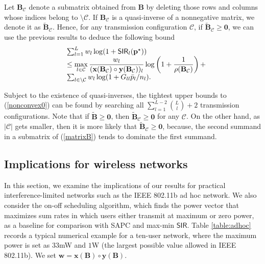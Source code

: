 \documentclass[10pt,twocolumn]{IEEEtran}
\newcommand{\0}{\mathbf{0}}
\newcommand{\1}{\mathbf{1}}
\begin{document}
Let $\mathbf{B}_{\mathcal{C}}$ denote a submatrix obtained from $\mathbf{B}$ by deleting those rows and columns whose indices belong to $\setminus \mathcal{C}$. If $\mathbf{B}_{\mathcal{C}}$ is a quasi-inverse of a nonnegative matrix, we denote it as $\mathbf{\tilde{B}}_{\mathcal{C}}$. Hence, for any transmission configuration $\mathcal{C}$, if $\mathbf{\tilde{B}}_{\mathcal{C}} \ge \mathbf{0}$, we can use the previous results to deduce the following bound
\begin{equation}
\begin{array}
[c]{rl}
& \sum_{l=1}^{L} w_l \log(1+\mathsf{SIR}_l(\mathbf{p}^{\star})) \\
& \le \displaystyle \max_{l \in \mathcal{C}} \frac{w_l}{(\mathbf{x}(\mathbf{B}_{\mathcal{C}}) \circ \mathbf{y}(\mathbf{B}_{\mathcal{C}}))_l} \log\left(1+\frac{1}{\rho(\mathbf{B}_{\mathcal{C}})}\right) + \\
& \sum_{l \in \setminus \mathcal{C}} w_l \log(1+ G_{ll}\bar{p}_l/n_l).
\end{array}
\end{equation}

Subject to the existence of quasi-inverses, the tightest upper bounds to (\ref{nonconvex0}) can be found by searching all $\sum_{l=1}^{L-2} {L \choose l} + 2$ transmission configurations. Note that if $\mathbf{\tilde{B}} \ge \mathbf{0}$, then $\mathbf{\tilde{B}}_{\mathcal{C}} \ge \mathbf{0}$ for any $\mathcal{C}$. On the other hand, as $|\mathcal{C}|$ gets smaller, then it is more likely that $\mathbf{\tilde{B}}_{\mathcal{C}} \ge \mathbf{0}$, because, the second summand in a submatrix of (\ref{matrixB}) tends to dominate the first summand.

\subsection{Implications for wireless networks}
\label{schedpc}
In this section, we examine the implications of our results for practical interference-limited networks such as the IEEE 802.11b ad hoc network. We also consider the on-off scheduling algorithm, which finds the power vector that maximizes sum rates in which users either transmit at maximum or zero power, as a baseline for comparison with SAPC and max-min $\mathsf{SIR}$. Table \ref{table:adhoc} records a typical numerical example for a ten-user network, where the maximum power is set as $33$mW and $1$W (the largest possible value allowed in IEEE 802.11b). We set $\mathbf{w}=\mathbf{x}(\mathbf{B}) \circ \mathbf{y}(\mathbf{B})$. 
\end{document}
